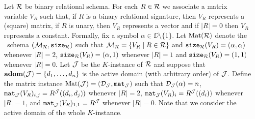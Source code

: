 
Let $\mathcal{R}$ be binary relational schema. For each $R\in \mathcal{R}$ we associate a matrix variable 
$V_R$ such that, if $R$ is a binary relational signature, then $V_R$ represents a (square) matrix, 
if $R$ is unary, then $V_R$ represents a vector and if $|R|=0$ then $V_R$ represents a constant. Formally, 
fix a symbol $\alpha \in \DD \setminus \{1\}$. Let $\text{Mat}(\mathcal{R})$ denote the \lang \ schema
$(\mathcal{M}_{\mathcal{R}},\texttt{size}_{\mathcal{R}})$ such that $\mathcal{M}_{\mathcal{R}} = \{ V_R \mid R \in \mathcal{R}\}$ and $\texttt{size}_{\mathcal{R}}(V_R) = (\alpha, \alpha)$ 
whenever $|R| = 2$, $\texttt{size}_{\mathcal{R}}(V_R) = (\alpha, 1)$ whenever $|R|=1$ and $\texttt{size}_{\mathcal{R}}(V_R) = (1, 1)$ whenever $|R|=0$. 
Let $\mathcal{J}$ be the $K$-instance of $\mathcal{R}$ and suppose that $\mathbf{adom}(\mathcal{J}) = \{d_1, \ldots, d_n\}$ is 
the active domain (with arbitrary order) of $\mathcal{J}$. 
Define the matrix instance $\text{Mat}(\mathcal{J}) = (\mathcal{D}_{\mathcal{J}},\texttt{mat}_{\mathcal{J}})$ such 
that $\mathcal{D}_{\mathcal{J}}(\alpha) = n$, $\texttt{mat}_{\mathcal{J}}(V_R)_{i,j} = R^{\mathcal{J}}((d_i, d_j))$ whenever $|R|=2$, $\texttt{mat}_{\mathcal{J}}(V_R)_{i} = R^{\mathcal{J}}((d_i))$ 
whenever $|R|=1$, 
and $\texttt{mat}_{\mathcal{J}}(V_R)_{1,1} = R^{\mathcal{J}}$ whenever $|R|=0$. 
Note that we consider the active domain of the whole $K$-instance.

\newcommand{\earae}{e_{\arae}}

